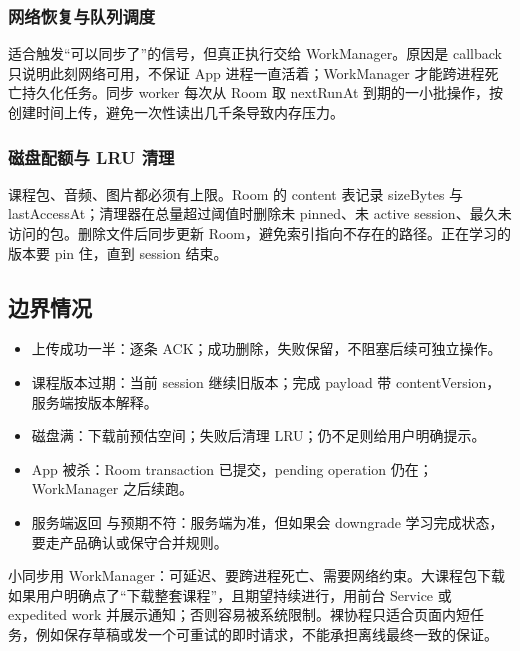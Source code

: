\subsubsection{网络恢复与队列调度}

 适合触发“可以同步了”的信号，但真正执行交给 WorkManager。原因是 callback 只说明此刻网络可用，不保证 App 进程一直活着；WorkManager 才能跨进程死亡持久化任务。同步 worker 每次从 Room 取 nextRunAt 到期的一小批操作，按创建时间上传，避免一次性读出几千条导致内存压力。

\subsubsection{磁盘配额与 LRU 清理}

课程包、音频、图片都必须有上限。Room 的 content 表记录 sizeBytes 与 lastAccessAt；清理器在总量超过阈值时删除未 pinned、未 active session、最久未访问的包。删除文件后同步更新 Room，避免索引指向不存在的路径。正在学习的版本要 pin 住，直到 session 结束。

\subsection{边界情况}

\begin{itemize}
  \item 上传成功一半：逐条 ACK；成功删除，失败保留，不阻塞后续可独立操作。
  \item 课程版本过期：当前 session 继续旧版本；完成 payload 带 contentVersion，服务端按版本解释。
  \item 磁盘满：下载前预估空间；失败后清理 LRU；仍不足则给用户明确提示。
  \item App 被杀：Room transaction 已提交，pending operation 仍在；WorkManager 之后续跑。
  \item 服务端返回  与预期不符：服务端为准，但如果会 downgrade 学习完成状态，要走产品确认或保守合并规则。
\end{itemize}

\begin{followup}
小同步用 WorkManager：可延迟、要跨进程死亡、需要网络约束。大课程包下载如果用户明确点了“下载整套课程”，且期望持续进行，用前台 Service 或 expedited work 并展示通知；否则容易被系统限制。裸协程只适合页面内短任务，例如保存草稿或发一个可重试的即时请求，不能承担离线最终一致的保证。
\end{followup}


